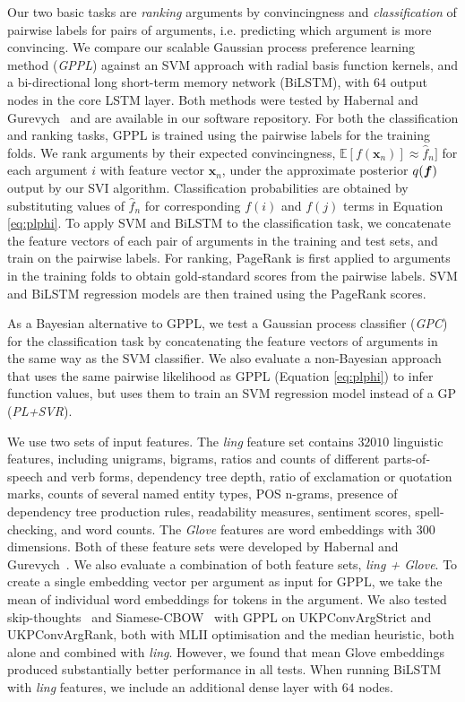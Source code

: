 Our two basic tasks are \emph{ranking} arguments by convincingness and  
\emph{classification} of pairwise labels for pairs of arguments, i.e. predicting which argument is more convincing. 
We compare our scalable Gaussian process preference learning method (\emph{GPPL}) against 
an SVM approach with radial basis function kernels, 
and a bi-directional long short-term memory network (BiLSTM),
with $64$ output nodes in the core LSTM layer. 
Both methods were tested by Habernal and Gurevych~ and are available in our software repository.
For both the classification and ranking tasks, GPPL is trained using the pairwise labels for the training folds.
We rank arguments by their expected convincingness, $\mathbb{E}[f(\mathbf{x}_n)]\approx \hat{f}_n]$ for each argument $i$ 
with feature vector $\mathbf{x}_n$, under the approximate posterior $q(\boldsymbol f)$
output by our SVI algorithm.
Classification probabilities are obtained by substituting values of $\hat{f}_n$ for corresponding $f(i)$ and $f(j)$ terms in Equation \ref{eq:plphi}.
To apply SVM and BiLSTM to the classification task, we concatenate the feature vectors of each pair of arguments in the training and test sets, and train on the pairwise labels.
For ranking, PageRank is first applied to arguments in the training folds to obtain gold-standard scores from the pairwise labels. SVM and BiLSTM regression models are then trained using the PageRank scores.

As a Bayesian alternative to GPPL, 
we test a Gaussian process classifier (\emph{GPC}) for the classification task 
by concatenating the feature vectors of arguments in the same way as the SVM classifier.
We also evaluate a non-Bayesian approach that uses the same pairwise likelihood as GPPL
(Equation \ref{eq:plphi}) to infer function values, 
but uses them to train an SVM regression model instead of a GP (\emph{PL+SVR}).

We use two sets of input features. The \emph{ling} feature set contains $32010$ linguistic features,  
including unigrams, bigrams, ratios and counts of different parts-of-speech and verb forms,
dependency tree depth, ratio of exclamation or quotation marks, 
counts of several named entity types, POS n-grams,
presence of dependency tree production rules, readability measures,
sentiment scores, spell-checking, and word counts.
The \emph{Glove} features are word embeddings with 300 dimensions. Both of these feature sets were
developed by Habernal and Gurevych~.
We also evaluate a combination of both feature sets, \emph{ling + Glove}.
To create a single embedding vector per argument as input for GPPL,
we take the mean of individual word embeddings for tokens in the argument.
We also tested skip-thoughts~\cite{kiros2015skip} and Siamese-CBOW~\cite{kenter2016siamesecbow} 
with GPPL on UKPConvArgStrict and UKPConvArgRank, both with MLII optimisation and the median heuristic,
 both alone and combined with \emph{ling}. 
However, we found that mean Glove embeddings produced substantially better performance in all tests.
When running BiLSTM with \emph{ling} features, we include an additional dense layer with $64$ nodes. 

